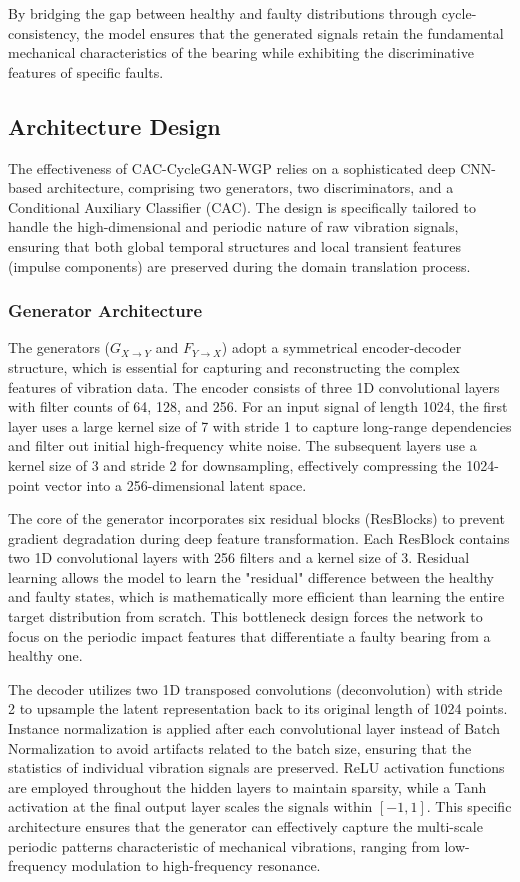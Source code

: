 By bridging the gap between healthy and faulty distributions through cycle-consistency, the model ensures that the generated signals retain the fundamental mechanical characteristics of the bearing while exhibiting the discriminative features of specific faults.

\subsection{Architecture Design}
The effectiveness of CAC-CycleGAN-WGP relies on a sophisticated deep CNN-based architecture, comprising two generators, two discriminators, and a Conditional Auxiliary Classifier (CAC). The design is specifically tailored to handle the high-dimensional and periodic nature of raw vibration signals, ensuring that both global temporal structures and local transient features (impulse components) are preserved during the domain translation process.

\subsubsection{Generator Architecture}
The generators ($G_{X \to Y}$ and $F_{Y \to X}$) adopt a symmetrical encoder-decoder structure, which is essential for capturing and reconstructing the complex features of vibration data. The encoder consists of three 1D convolutional layers with filter counts of 64, 128, and 256. For an input signal of length 1024, the first layer uses a large kernel size of 7 with stride 1 to capture long-range dependencies and filter out initial high-frequency white noise. The subsequent layers use a kernel size of 3 and stride 2 for downsampling, effectively compressing the 1024-point vector into a 256-dimensional latent space. 

The core of the generator incorporates six residual blocks (ResBlocks) to prevent gradient degradation during deep feature transformation. Each ResBlock contains two 1D convolutional layers with 256 filters and a kernel size of 3. Residual learning allows the model to learn the "residual" difference between the healthy and faulty states, which is mathematically more efficient than learning the entire target distribution from scratch. This bottleneck design forces the network to focus on the periodic impact features that differentiate a faulty bearing from a healthy one.

The decoder utilizes two 1D transposed convolutions (deconvolution) with stride 2 to upsample the latent representation back to its original length of 1024 points. Instance normalization is applied after each convolutional layer instead of Batch Normalization to avoid artifacts related to the batch size, ensuring that the statistics of individual vibration signals are preserved. ReLU activation functions are employed throughout the hidden layers to maintain sparsity, while a Tanh activation at the final output layer scales the signals within $[-1, 1]$. This specific architecture ensures that the generator can effectively capture the multi-scale periodic patterns characteristic of mechanical vibrations, ranging from low-frequency modulation to high-frequency resonance.

